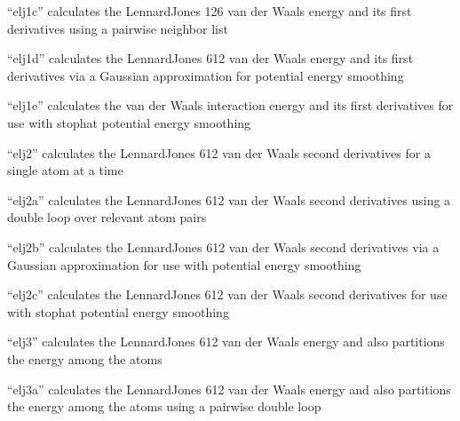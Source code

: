\documentclass[letterpaper,11pt,english]{sphinxmanual}
\begin{document}
\sphinxAtStartPar
“elj1c” calculates the Lennard\sphinxhyphen{}Jones 12\sphinxhyphen{}6 van der Waals energy and its first derivatives using a pairwise neighbor list

\sphinxAtStartPar
{}

\sphinxAtStartPar
“elj1d” calculates the Lennard\sphinxhyphen{}Jones 6\sphinxhyphen{}12 van der Waals energy and its first derivatives via a Gaussian approximation for potential energy smoothing

\sphinxAtStartPar
{}

\sphinxAtStartPar
“elj1e” calculates the van der Waals interaction energy and its first derivatives for use with stophat potential energy smoothing

\sphinxAtStartPar
{}

\sphinxAtStartPar
“elj2” calculates the Lennard\sphinxhyphen{}Jones 6\sphinxhyphen{}12 van der Waals second derivatives for a single atom at a time

\sphinxAtStartPar
{}

\sphinxAtStartPar
“elj2a” calculates the Lennard\sphinxhyphen{}Jones 6\sphinxhyphen{}12 van der Waals second derivatives using a double loop over relevant atom pairs

\sphinxAtStartPar
{}

\sphinxAtStartPar
“elj2b” calculates the Lennard\sphinxhyphen{}Jones 6\sphinxhyphen{}12 van der Waals second derivatives via a Gaussian approximation for use with potential energy smoothing

\sphinxAtStartPar
{}

\sphinxAtStartPar
“elj2c” calculates the Lennard\sphinxhyphen{}Jones 6\sphinxhyphen{}12 van der Waals second derivatives for use with stophat potential energy smoothing

\sphinxAtStartPar
{}

\sphinxAtStartPar
“elj3” calculates the Lennard\sphinxhyphen{}Jones 6\sphinxhyphen{}12 van der Waals energy and also partitions the energy among the atoms

\sphinxAtStartPar
{}

\sphinxAtStartPar
“elj3a” calculates the Lennard\sphinxhyphen{}Jones 6\sphinxhyphen{}12 van der Waals energy and also partitions the energy among the atoms using a pairwise double loop
\end{document}

